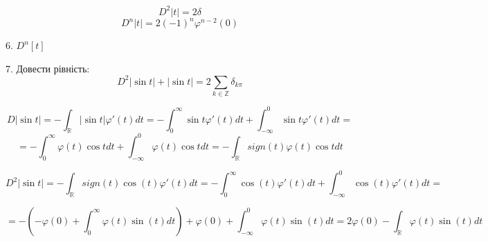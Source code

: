     $$D^2 |t| = 2 \delta$$
    $$D^n |t| = 2(-1)^n \varphi^{n-2}(0)$$

6. $D^n[t]$


7. Довести рівність:
$$
D^2|\sin t|+|\sin t|=2 \sum_{k \in \mathbb{Z}} \delta_{k \pi}
$$

$$
    D |\sin t| = -\int_{\mathbb{R}} |\sin t| \varphi'(t)dt = 
    -\int_{0}^{\infty} \sin t \varphi'(t)dt + \int_{-\infty}^{0} \sin t \varphi'(t)dt =$$
$$
    =-\int_{0}^{\infty} \varphi(t) \cos t dt + \int_{-\infty}^{0} \varphi(t) \cos t dt =
    -\int_{\mathbb{R}} sign(t) \varphi(t) \cos t dt
$$

$$
    D^2 |\sin t| = -\int_{\mathbb{R}} sign(t) \cos(t) \varphi'(t)dt = 
    -\int_{0}^{\infty} \cos(t) \varphi'(t)dt + \int_{-\infty}^{0} \cos(t) \varphi'(t)dt =
$$

$$
    = - (-\varphi(0) + \int_{0}^{\infty} \varphi(t) \sin(t)dt) + 
    \varphi(0) + \int_{-\infty}^{0} \varphi(t) \sin(t)dt = 
    2\varphi(0) - \int_{\mathbb{R}} \varphi(t) \sin(t) dt
$$